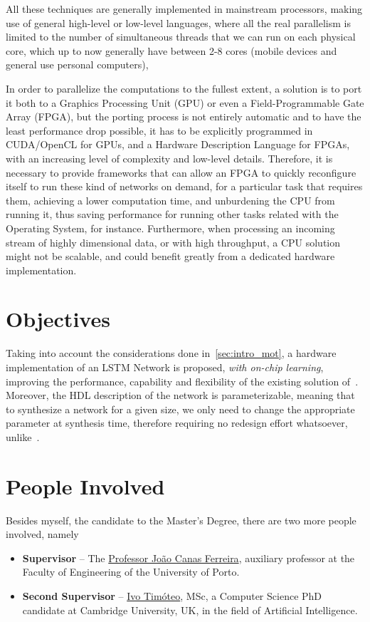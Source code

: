 All these techniques are generally implemented in mainstream processors, making use of general high-level or low-level languages, where all the real
parallelism is limited to the number of simultaneous threads that we can run on each physical core, which up to now generally have between 2-8 cores
(mobile devices and general use personal computers),

In order to parallelize the computations to the fullest extent, a solution is to port it both to a Graphics Processing Unit (GPU) or even a
Field-Programmable Gate Array (FPGA), but the porting process is not entirely automatic and to have the least performance drop possible, it has
to be explicitly programmed in CUDA/OpenCL for GPUs, and a Hardware Description Language for FPGAs, with an increasing level of complexity and
low-level details. Therefore, it is necessary to provide frameworks that can allow an FPGA to quickly reconfigure itself to run these kind of
networks on demand, for a particular task that requires them, achieving a lower computation time, and unburdening the CPU from running it,
thus saving performance for running other tasks related with the Operating System, for instance. Furthermore, when processing an incoming stream
of highly dimensional data, or with high throughput, a CPU solution might not be scalable, and could benefit greatly from a dedicated hardware implementation.

\section{Objectives}\label{sec:intro_obj}
Taking into account the considerations done in~\ref{sec:intro_mot}, a hardware implementation of an
LSTM Network is proposed, \emph{with on-chip learning}, improving the performance, capability and flexibility of the existing solution of~\cite{Chang15}.
Moreover, the HDL description of the network is parameterizable, meaning that to synthesize a network for a given size, we only need to
change the appropriate parameter at synthesis time, therefore requiring no redesign effort whatsoever, unlike~\cite{Chang15}.

\section{People Involved}\label{sec:intro_people}
Besides myself, the candidate to the Master's Degree, there are two more people involved, namely

\begin{itemize}
    \item \textbf{Supervisor} -- The \href{https://sigarra.up.pt/feup/pt/func\_geral.formview?p\_codigo=210963}{Professor João Canas Ferreira}, auxiliary professor at the Faculty of Engineering of the University of Porto.
    \item \textbf{Second Supervisor} -- \href{http://www.cl.cam.ac.uk/~ijpdmt2/}{Ivo Timóteo}, MSc, a Computer Science PhD candidate at Cambridge University, UK, in the field of Artificial Intelligence.
\end{itemize}

